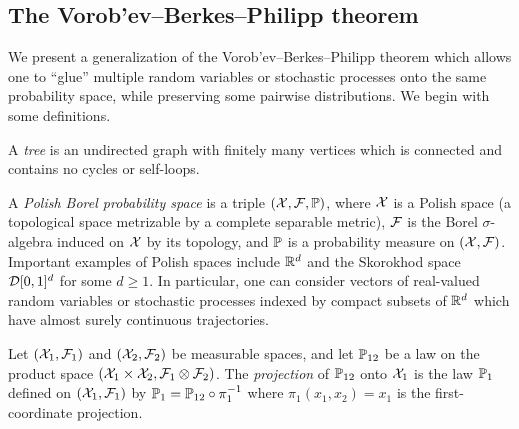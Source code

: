 \subsection{The Vorob'ev--Berkes--Philipp theorem}

We present a generalization of the Vorob'ev--Berkes--Philipp theorem
\citep{dudley1999uniform}
which allows one to ``glue'' multiple random variables
or stochastic processes onto the same probability space,
while preserving some pairwise distributions.
We begin with some definitions.

\begin{definition}[Tree]
  A \emph{tree} is
  an undirected graph with finitely many vertices
  which is connected and
  contains no cycles
  or self-loops.
\end{definition}

\begin{definition}
  A \emph{Polish Borel probability space}
  is a triple $(\cX, \cF, \P)$,
  where $\cX$ is a Polish space
  (a topological space metrizable by a complete separable metric),
  $\cF$ is the Borel $\sigma$-algebra induced on $\cX$ by its topology,
  and $\P$ is a probability measure on $(\cX, \cF)$.
  Important examples of Polish spaces
  include
  $\R^d$ and
  the Skorokhod space
  $\cD[0,1]^d$
  for some $d \geq 1$.
  In particular,
  one can consider vectors of real-valued random variables
  or stochastic processes indexed by
  compact subsets of $\R^d$ which have
  almost surely continuous trajectories.
\end{definition}

\begin{definition}
  Let $(\cX_1, \cF_1)$ and $(\cX_2, \cF_2)$
  be measurable spaces, and
  let $\P_{12}$ be a law on the
  product space
  $(\cX_1 \times \cX_2, \cF_1 \otimes \cF_2)$.
  The \emph{projection} of $\P_{12}$
  onto $\cX_1$ is the law
  $\P_1$ defined on $(\cX_1, \cF_1)$
  by $\P_1 = \P_{12} \circ \pi_1^{-1}$
  where $\pi_1(x_1, x_2) = x_1$
  is the first-coordinate projection.
\end{definition}

